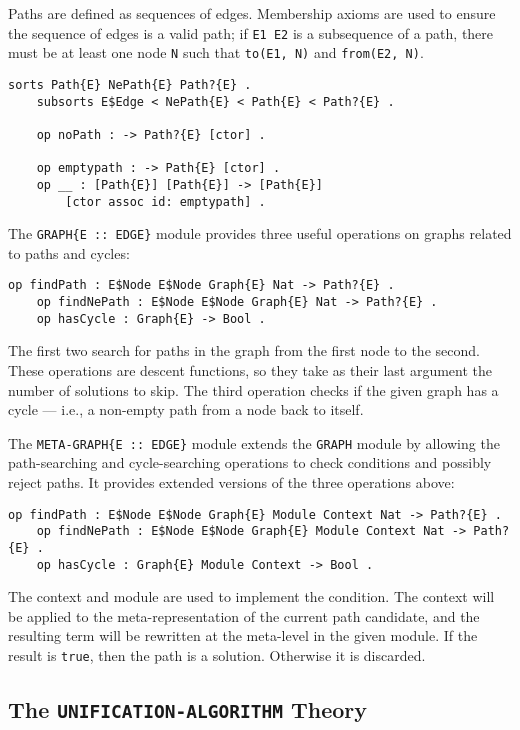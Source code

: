 \documentclass[11pt,twoside,titlepage]{article}
\newcommand{\TitleListing}[1]{\texorpdfstring{\lstinline|#1|}{#1}}
\begin{document}
Paths are defined as sequences of edges. Membership axioms are used to ensure
the sequence of edges is a valid path; if \lstinline|E1 E2| is a subsequence of
a path, there must be at least one node \lstinline|N| such that
\lstinline|to(E1, N)| and \lstinline|from(E2, N)|.
\begin{lstlisting}[language=Maude, style=smalllisting]
    sorts Path{E} NePath{E} Path?{E} .
    subsorts E$Edge < NePath{E} < Path{E} < Path?{E} .

    op noPath : -> Path?{E} [ctor] .

    op emptypath : -> Path{E} [ctor] .
    op __ : [Path{E}] [Path{E}] -> [Path{E}]
        [ctor assoc id: emptypath] .
\end{lstlisting}

The \lstinline|GRAPH{E :: EDGE}| module provides three useful operations on
graphs related to paths and cycles:
\begin{lstlisting}[language=Maude, style=smalllisting]
    op findPath : E$Node E$Node Graph{E} Nat -> Path?{E} .
    op findNePath : E$Node E$Node Graph{E} Nat -> Path?{E} .
    op hasCycle : Graph{E} -> Bool .
\end{lstlisting}
The first two search for paths in the graph from the first node to the second.
These operations are descent functions, so they take as their last argument the
number of solutions to skip. The third operation checks if the given graph has
a cycle --- i.e., a non-empty path from a node back to itself.

The \lstinline|META-GRAPH{E :: EDGE}| module extends the \lstinline|GRAPH|
module by allowing the path-searching and cycle-searching operations to check
conditions and possibly reject paths. It provides extended versions of the
three operations above:
\begin{lstlisting}[language=Maude, style=smalllisting]
    op findPath : E$Node E$Node Graph{E} Module Context Nat -> Path?{E} .
    op findNePath : E$Node E$Node Graph{E} Module Context Nat -> Path?{E} .
    op hasCycle : Graph{E} Module Context -> Bool .
\end{lstlisting}
The context and module are used to implement the condition. The context will be
applied to the meta-representation of the current path candidate, and the
resulting term will be rewritten at the meta-level in the given module. If the
result is \lstinline|true|, then the path is a solution. Otherwise it is
discarded.

\subsection{The \TitleListing{UNIFICATION-ALGORITHM} Theory}
\label{subsection:unif-alg-mod}
\end{document}
